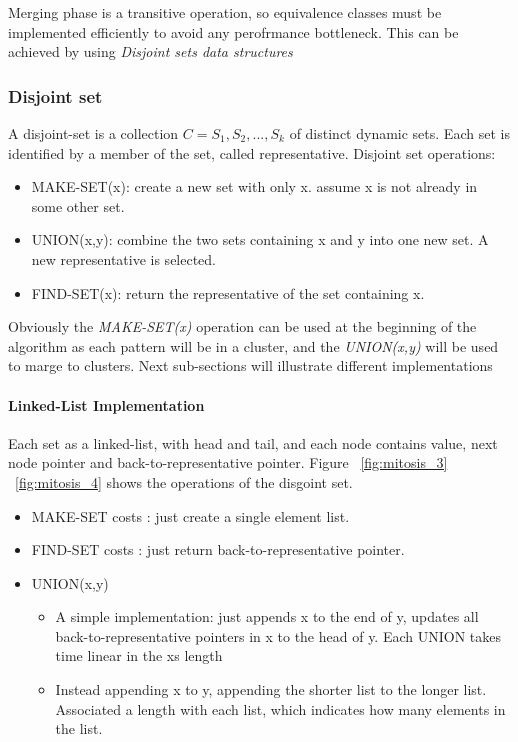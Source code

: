Merging phase is a transitive operation, so equivalence classes must be implemented efficiently to avoid any perofrmance bottleneck.
This can be achieved by using \textit{Disjoint sets data structures}
\subsubsection{Disjoint set}

A disjoint-set is a collection $C={S_1, S_2,..., S_k}$ of distinct dynamic sets.
Each set is identified by a member of the set, called representative.
Disjoint set operations:
\begin{itemize}
\item MAKE-SET(x): create a new set with only x. assume x is not already in some other set.
\item UNION(x,y): combine the two sets containing x and y into one new set. A new representative is selected.
\item FIND-SET(x): return the representative of the set containing x.
\end{itemize}
Obviously the \textit{MAKE-SET(x)} operation can be used at the beginning of the algorithm as each pattern will be in a cluster, and the \textit{UNION(x,y)} will be used to marge to clusters.
Next sub-sections will illustrate different implementations
\paragraph{Linked-List Implementation}
Each set as a linked-list, with head and tail, and each node contains value, next node pointer and back-to-representative pointer.
Figure ~\ref{fig:mitosis_3} ~\ref{fig:mitosis_4} shows the operations of the disgoint set.
\begin{itemize}
\item MAKE-SET costs : just create a single element list.
\item FIND-SET costs : just return back-to-representative pointer.
\item {UNION(x,y) 
\begin{itemize}
\item {A simple implementation: just appends x to the end of y, updates all back-to-representative pointers in x to the head of y.
Each UNION takes time linear in the xs length}
\item {Instead appending x to y, appending the shorter list to the longer list.
Associated a length with each list, which indicates how many elements in the list.
}
\end{itemize}
}
\end{itemize}

